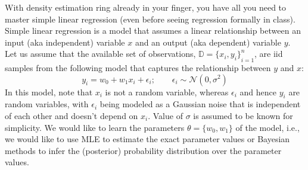 \documentclass[solution,addpoints,12pt]{exam}
\begin{document}
\begin{questions}
With density estimation ring already in your finger, you have all you need to master simple linear regression (even before seeing regression formally in class). Simple linear regression is a model that assumes a linear relationship between an input (aka independent) variable $x$ and an output (aka dependent) variable $y$.
\newline
Let us assume that the available set of observations, $\mathbb{D} = {\{x_i, y_i\}}_{i=1}^{n}$, are iid samples from the following model that captures the relationship between $y$ and $x$: 
\[y_i = w_0 + w_1 x_i + \epsilon_i; \qquad \epsilon_i \sim \mathcal{N}(0,\sigma^2) \]
In this model, note that $x_i$ is not a random variable, whereas $\epsilon_i$ and hence $y_i$ are random variables, with $\epsilon_i$ being modeled as a Gaussian noise that is independent of each other and doesn't depend on $x_i$. Value of $\sigma$ is assumed to be known for simplicity.\newline
We would like to learn the parameters $\theta=\{w_0, w_1\}$ of the model, i.e., we would like to use MLE to estimate the exact parameter values or Bayesian methods to infer the (posterior) probability distribution over the parameter values.

\end{questions}
\end{document}
